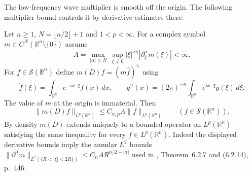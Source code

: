 The low-frequency wave multiplier is smooth off the origin. The following multiplier bound controls it by derivative estimates there.

\begin{Proposition}\label{ext:mihlin-multiplier}
Let $n\ge1$, $N=\lfloor n/2\rfloor+1$ and $1<p<\infty$. For a complex symbol $m\in C^N(\mathbb R^n\setminus\{0\})$ assume
\[
 A=\max_{|\alpha|\le N}\ \sup_{\xi\ne0}|\xi|^{|\alpha|}
             |\partial_\xi^\alpha m(\xi)|<\infty.
\]
For $f\in\mathcal S(\mathbb R^n)$ define $m(D)f=(m\widehat f)^\vee$ using
\[
 \widehat f(\xi)=\int_{\mathbb R^n}e^{-ix\cdot\xi}f(x)\,dx,\qquad
 g^\vee(x)=(2\pi)^{-n}\int_{\mathbb R^n}e^{ix\cdot\xi}g(\xi)\,d\xi .
\]
The value of $m$ at the origin is immaterial. Then
\[
 \|m(D)f\|_{L^p(\mathbb R^n)}
 \le C_{n,p} A\|f\|_{L^p(\mathbb R^n)}
 \qquad (f\in\mathcal S(\mathbb R^n)).
\]
By density $m(D)$ extends uniquely to a bounded operator on $L^p(\mathbb R^n)$ satisfying the same inequality for every $f\in L^p(\mathbb R^n)$.
Indeed the displayed derivative bounds imply the annular $L^2$ bounds
$\|\partial^\alpha m\|_{L^2(\{R<|\xi|<2R\})}\le C_n A R^{n/2-|\alpha|}$
used in \cite{r-32}, Theorem~6.2.7 and (6.2.14), p.~446.
\end{Proposition}
